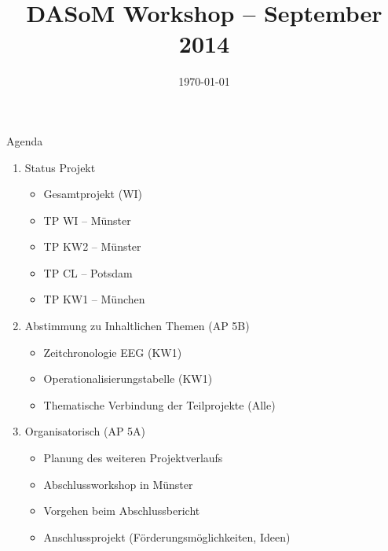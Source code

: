 \documentclass{beamer}
\title[DASoM Workshop 2014]{DASoM Workshop -- September 2014}
\date{\today}
\begin{document}
    \begin{frame}{}
      \titlepage
    \end{frame}


    \begin{frame}{Agenda}
      \begin{enumerate}
        \item Status Projekt
          \begin{itemize}
          \item Gesamtprojekt (WI)
          \item TP WI – M\"unster
          \item TP KW2 – M\"unster
          \item TP CL – Potsdam
          \item TP KW1 – M\"unchen
          \end{itemize}

        \item Abstimmung zu Inhaltlichen Themen (AP 5B)
          \begin{itemize}
          \item Zeitchronologie EEG (KW1)
          \item Operationalisierungstabelle (KW1)
          \item Thematische Verbindung der Teilprojekte (Alle)
          \end{itemize}

        \item Organisatorisch (AP 5A)
          \begin{itemize}
          \item Planung des weiteren Projektverlaufs
          \item Abschlussworkshop in M\"unster
          \item Vorgehen beim Abschlussbericht
          \item Anschlussprojekt (F\"orderungsm\"oglichkeiten, Ideen)
          \end{itemize}
      \end{enumerate}
    \end{frame}
    
\end{document}
